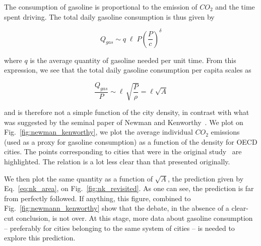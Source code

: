 The consumption of gasoline is proportional to the emission of $CO_2$ and the time spent driving.
The total daily gasoline consumption is thus given by

\begin{equation} 
    Q_{gas} \sim q\; \ell\; P \left(\frac{P}{c}\right)^{\delta}
\end{equation}

where $q$ is the average quantity of gasoline needed per unit time. From this
expression, we see that the total daily gasoline consumption per capita scales
as

\begin{equation} 
    \frac{Q_{gas}}{P}\sim \ell\, \sqrt{\frac{P}{\rho}} = \ell
\sqrt{A} 
    \label{eq:nk_area}
\end{equation}

and is therefore not a simple function of the city density, in contrast with
what was suggested by the seminal paper of Newman and
Kenworthy~\cite{Newman:1989}. We plot on Fig.~\ref{fig:newman_kenworthy}, we
plot the average individual $CO_2$ emissions (used as a proxy for gasoline
consumption) as a function of the density for OECD cities. The points
corresponding to cities that were in the original study~\cite{Newman:1989} are
highlighted. The relation is a lot less clear than that presented originally.  

We then plot the same quantity as a function of $\sqrt{A}$, the prediction given
by Eq.~\ref{eq:nk_area}, on Fig.~\ref{fig:nk_revisited}. As one can see, the
prediction is far from perfectly followed. If anything, this figure, combined to
Fig.~\ref{fig:newmann_kenworthy} show that the debate, in the absence of a
clear-cut conclusion, is not over. At this stage, more data about gasoline
consumption -- preferably for cities belonging to the same system of cities --
is needed to explore this prediction.


